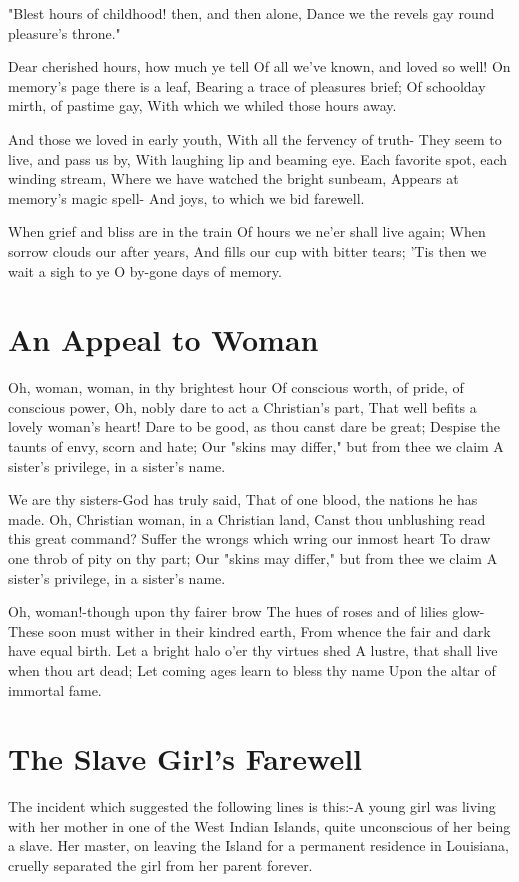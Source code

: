 \documentclass[11pt,a4paper]{article}
\begin{document}
"Blest hours of childhood! then, and then alone,
Dance we the revels gay round pleasure's throne."

Dear cherished hours, how much ye tell
Of all we've known, and loved so well!
On memory's page there is a leaf,
Bearing a trace of pleasures brief;
Of schoolday mirth, of pastime gay,
With which we whiled those hours away.

And those we loved in early youth,
With all the fervency of truth-
They seem to live, and pass us by,
With laughing lip and beaming eye.
Each favorite spot, each winding stream,
Where we have watched the bright sunbeam,
Appears at memory's magic spell-
And joys, to which we bid farewell.

When grief and bliss are in the train
Of hours we ne'er shall live again;
When sorrow clouds our after years,
And fills our cup with bitter tears;
'Tis then we wait a sigh to ye
O by-gone days of memory.

\section{An Appeal to Woman}

Oh, woman, woman, in thy brightest hour
Of conscious worth, of pride, of conscious power,
Oh, nobly dare to act a Christian's part,
That well befits a lovely woman's heart!
Dare to be good, as thou canst dare be great;
Despise the taunts of envy, scorn and hate;
Our "skins may differ," but from thee we claim
A sister's privilege, in a sister's name.

We are thy sisters-God has truly said,
That of one blood, the nations he has made.
Oh, Christian woman, in a Christian land,
Canst thou unblushing read this great command?
Suffer the wrongs which wring our inmost heart
To draw one throb of pity on thy part;
Our "skins may differ," but from thee we claim
A sister's privilege, in a sister's name.

Oh, woman!-though upon thy fairer brow
The hues of roses and of lilies glow-
These soon must wither in their kindred earth,
From whence the fair and dark have equal birth.
Let a bright halo o'er thy virtues shed
A lustre, that shall live when thou art dead;
Let coming ages learn to bless thy name
Upon the altar of immortal fame.

\section{The Slave Girl's Farewell}

The incident which suggested the following lines is this:-A young girl was living with her mother in one of the West Indian Islands, quite unconscious of her being a slave. Her master, on leaving the Island for a permanent residence in Louisiana, cruelly separated the girl from her parent forever.
\end{document}
